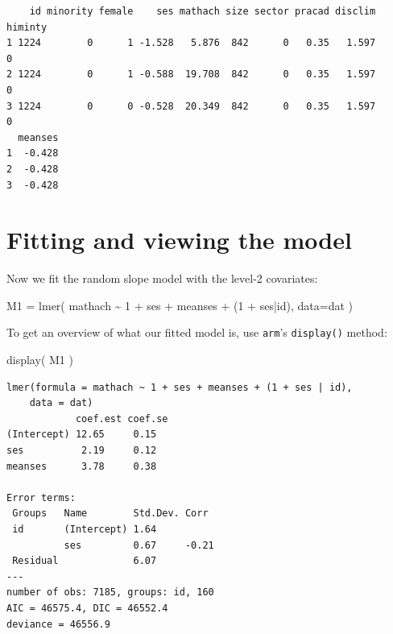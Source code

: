 \documentclass[
  letterpaper,
  DIV=11,
  numbers=noendperiod]{scrreprt}
\newenvironment{Shaded}{\begin{snugshade}}{\end{snugshade}}
\newcommand{\AttributeTok}[1]{\textcolor[rgb]{0.49,0.56,0.16}{#1}}
\newcommand{\DecValTok}[1]{\textcolor[rgb]{0.25,0.63,0.44}{#1}}
\newcommand{\FunctionTok}[1]{\textcolor[rgb]{0.02,0.16,0.49}{#1}}
\newcommand{\NormalTok}[1]{\textcolor[rgb]{0.00,0.44,0.13}{#1}}
\newcommand{\OtherTok}[1]{\textcolor[rgb]{0.00,0.44,0.13}{#1}}
\newcommand{\SpecialCharTok}[1]{\textcolor[rgb]{0.25,0.44,0.63}{#1}}
\begin{document}
\begin{verbatim}
    id minority female    ses mathach size sector pracad disclim himinty
1 1224        0      1 -1.528   5.876  842      0   0.35   1.597       0
2 1224        0      1 -0.588  19.708  842      0   0.35   1.597       0
3 1224        0      0 -0.528  20.349  842      0   0.35   1.597       0
  meanses
1  -0.428
2  -0.428
3  -0.428
\end{verbatim}

\hypertarget{fitting-and-viewing-the-model}{%
\section{Fitting and viewing the
model}\label{fitting-and-viewing-the-model}}

Now we fit the random slope model with the level-2 covariates:

\begin{Shaded}
\begin{Highlighting}[]
\NormalTok{M1 }\OtherTok{=} \FunctionTok{lmer}\NormalTok{( mathach }\SpecialCharTok{\textasciitilde{}} \DecValTok{1} \SpecialCharTok{+}\NormalTok{ ses }\SpecialCharTok{+}\NormalTok{ meanses }\SpecialCharTok{+}\NormalTok{ (}\DecValTok{1} \SpecialCharTok{+}\NormalTok{ ses}\SpecialCharTok{|}\NormalTok{id), }\AttributeTok{data=}\NormalTok{dat )}
\end{Highlighting}
\end{Shaded}

To get an overview of what our fitted model is, use \texttt{arm}'s
\texttt{display()} method:

\begin{Shaded}
\begin{Highlighting}[]
\FunctionTok{display}\NormalTok{( M1 )}
\end{Highlighting}
\end{Shaded}

\begin{verbatim}
lmer(formula = mathach ~ 1 + ses + meanses + (1 + ses | id), 
    data = dat)
            coef.est coef.se
(Intercept) 12.65     0.15  
ses          2.19     0.12  
meanses      3.78     0.38  

Error terms:
 Groups   Name        Std.Dev. Corr  
 id       (Intercept) 1.64           
          ses         0.67     -0.21 
 Residual             6.07           
---
number of obs: 7185, groups: id, 160
AIC = 46575.4, DIC = 46552.4
deviance = 46556.9 
\end{verbatim}
\end{document}
